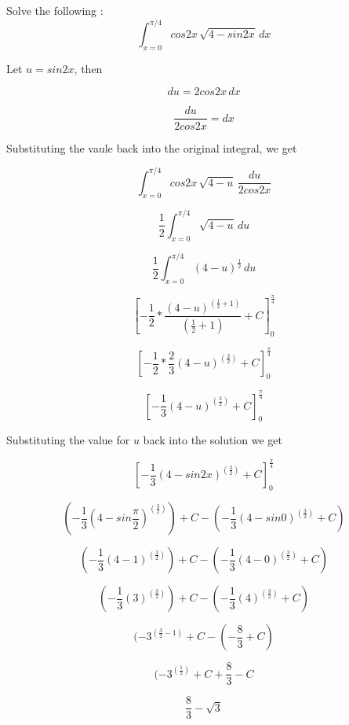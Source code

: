 \documentclass{article}
\begin{document}
	Solve the following : 
	\[
	\int_{x=0}^{\pi/4}cos2x\,\sqrt{4-sin2x}\,dx
	\]
	
	Let $u = sin2x$, then 
	
	
	\[
	du = 2cos2x\,dx
	\]
	
	\[
	\frac{du}{2cos2x} = dx
	\]
	
	Substituting the vaule back into the original integral, we get 
	
	\[
		\int_{x=0}^{\pi/4}cos2x\,\sqrt{4-u}\,\frac{du}{2cos2x}
	\]
	
	\[
	      \frac{1}{2}\int_{x=0}^{\pi/4}\sqrt{4-u}\,{du}
	\]
	
	\[
	\frac{1}{2}\int_{x=0}^{\pi/4}{(4-u)}^\frac{1}{2}\,{du}
	\]
	
	\[
	\left[-\frac{1}{2}* \frac{(4-u)^(\frac{1}{2} + 1)} {(\frac{1}{2} + 1)} + C\right]_0^\frac{\pi}{4}
	\]
	
	
	\[
	\left[-\frac{1}{2}*\frac{2}{3}{(4-u)^(\frac{3}{2})} + C\right]_0^\frac{\pi}{4}
	\]
	
	\[
	\left[-\frac{1}{3}{(4-u)^(\frac{3}{2})} + C\right]_0^\frac{\pi}{4}
	\]
	
	Substituting the value for $u$ back into the solution we get
	
	\[
	\left[-\frac{1}{3}{(4-sin2x)^(\frac{3}{2})} + C\right]_0^\frac{\pi}{4}
	\]
	
	\[
	(-\frac{1}{3}{(4-sin\frac{\pi}{2})^(\frac{3}{2})}) + C - (-\frac{1}{3}{(4-sin0)^(\frac{3}{2})} + C)
	\]
	
	\[
	(-\frac{1}{3}{(4-1)^(\frac{3}{2})}) + C - (-\frac{1}{3}{(4-0)^(\frac{3}{2})} + C)
	\]
	
	
	\[
	(-\frac{1}{3}{(3)^(\frac{3}{2})}) + C - (-\frac{1}{3}{(4)^(\frac{3}{2})} + C)
	\]
	
	\[
	(-3^(\frac{3}{2} - 1) + C - (-\frac{8}{3} + C)
	\]
	
	\[
	(-3^(\frac{1}{2}) + C + \frac{8}{3} - C
	\]
	
	\[
	\frac{8}{3} -\sqrt{3}
	\]
	
	
\end{document}
